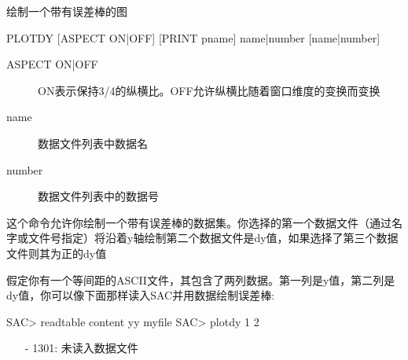 \label{cmd:plotdy}

绘制一个带有误差棒的图

\begin{SACSTX}
PLOTDY [ASPECT ON|OFF] [PRINT pname] name|number [name|number]
\end{SACSTX}

\begin{description}
\item [ASPECT ON|OFF] ON表示保持3/4的纵横比。OFF允许纵横比随着窗口维度的变换而变换 
\item [name] 数据文件列表中数据名 
\item [number] 数据文件列表中的数据号 
\end{description}

这个命令允许你绘制一个带有误差棒的数据集。你选择的第一个数据文件（通过名字或文件号指定）将沿着y轴绘制第二个数据文件是dy值，如果选择了第三个数据文件则其为正的dy值

假定你有一个等间距的ASCII文件，其包含了两列数据。第一列是y值，第二列是dy值，你可以像下面那样读入SAC并用数据绘制误差棒:
\begin{SACCode}
SAC> readtable content yy myfile
SAC> plotdy 1 2
\end{SACCode}

\begin{itemize}
\item[-]1301: 未读入数据文件
\end{itemize}

